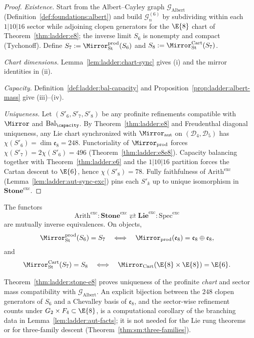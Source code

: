 \begin{proof}
\emph{Existence.}
Start from the Albert--Cayley graph
$\mathcal{G}_{\mathrm{Albert}}$ (Definition~\ref{def:foundations:albert}) and
build $\mathcal{G}_n^{(6)}$ by subdividing within each $1|10|16$ sector while
adjoining clopen generators for the $\E{8}$ chart of
Theorem~\ref{thm:ladder:e8}; the inverse limit $S_6$ is nonempty and compact
(Tychonoff). Define $S_7:=\Mirror_{\mathrm{St}}^{\mathrm{prod}}(S_6)$ and
$S_8:=\Mirror_{\mathrm{St}}^{\mathrm{Cart}}(S_7)$.

\emph{Chart dimensions.}
Lemma~\ref{lem:ladder:chart-sync} gives (i) and the mirror identities in (ii).

\emph{Capacity.}
Definition~\ref{def:ladder:bal-capacity} and
Proposition~\ref{prop:ladder:albert-mass} give (iii)--(iv).

\emph{Uniqueness.}
Let $(S'_6,S'_7,S'_8)$ be any profinite refinements compatible with
$\Mirror$ and $\mathrm{Bal}_\capacity$. By Theorem~\ref{thm:ladder:e8} and
Freudenthal diagonal uniqueness, any Lie chart synchronized with
$\Mirror_{\mathrm{aut}}$ on $(\mathcal{D}_4,\mathcal{D}_5)$ has
$\chi(S'_6)=\dim\mathfrak{e}_8=248$. Functoriality of
$\Mirror_{\mathrm{prod}}$ forces $\chi(S'_7)=2\chi(S'_6)=496$
(Theorem~\ref{thm:ladder:e8e8}). Capacity balancing together with
Theorem~\ref{thm:ladder:e6} and the $1|10|16$ partition forces the Cartan
descent to $\E{6}$, hence $\chi(S'_8)=78$. Fully faithfulness of
$\mathrm{Arith}^{\mathrm{exc}}$ (Lemma~\ref{lem:ladder:aut-sync-exc}) pins
each $S'_k$ up to unique isomorphism in $\mathbf{Stone}^{\mathrm{exc}}$.
\end{proof}

\begin{corollary}
\label{cor:ladder:exc-equiv}
The functors
\[
  \mathrm{Arith}^{\mathrm{exc}}:\mathbf{Stone}^{\mathrm{exc}}\rightleftarrows
  \mathbf{Lie}^{\mathrm{exc}}:\mathrm{Spec}^{\mathrm{exc}}
\]
are mutually inverse equivalences. On objects,
\[
  \Mirror_{\mathrm{St}}^{\mathrm{prod}}(S_6)=S_7
  \quad\Longleftrightarrow\quad
  \Mirror_{\mathrm{prod}}(\mathfrak{e}_8)=\mathfrak{e}_8\oplus\mathfrak{e}_8,
\]
and
\[
  \Mirror_{\mathrm{St}}^{\mathrm{Cart}}(S_7)=S_8
  \quad\Longleftrightarrow\quad
  \Mirror_{\mathrm{Cart}}(\E{8}\times\E{8})=\E{6}.
\]
\end{corollary}

\begin{remark}\label{rem:ladder:stone-cells}
Theorem~\ref{thm:ladder:stone-e8} proves uniqueness of the profinite
\emph{chart} and sector mass compatibility with
$\mathcal{G}_{\mathrm{Albert}}$. An explicit bijection between the $248$
clopen generators of $S_6$ and a Chevalley basis of $\mathfrak{e}_8$, and the
sector-wise refinement counts under $G_2\times F_4\subset\E{8}$, is a
computational corollary of the branching data in
Lemma~\ref{lem:ladder:aut-facts}; it is not needed for the Lie rung theorems
or for three-family descent (Theorem~\ref{thm:sm:three-families}).
\end{remark}

